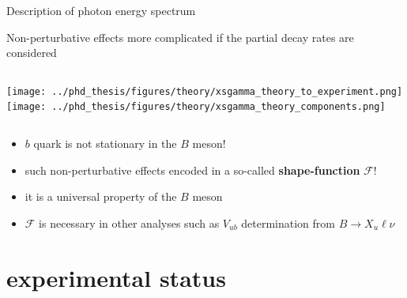 \documentclass[xcolor=dvipsnames]{beamer}
\begin{document}
\begin{frame}{Description of \BtoXsgamma photon energy spectrum}

   \scriptsize\centering

   Non-perturbative effects more complicated if the partial decay rates are considered

   \vspace{10pt}

   \begin{columns}
      \centering
      \texttt{[image: ../phd\_thesis/figures/theory/xsgamma\_theory\_to\_experiment.png]}
      \centering
      \texttt{[image: ../phd\_thesis/figures/theory/xsgamma\_theory\_components.png]}
   \end{columns}

   \begin{itemize}
      \item $b$ quark is not stationary in the $B$ meson!
      \item such non-perturbative effects encoded in a so-called \textbf{shape-function} $\bm{\mathcal{F}}$!
      \item[\ra] it is a universal property of the $B$ meson
      \item[\ra] $\mathcal{F}$ is necessary in other analyses such as $V_{ub}$ determination from $B\to X_u\ell\nu$ 
   \end{itemize}
   
\end{frame}

   \section{\safeBtoXsdgamma experimental status}
\end{document}
